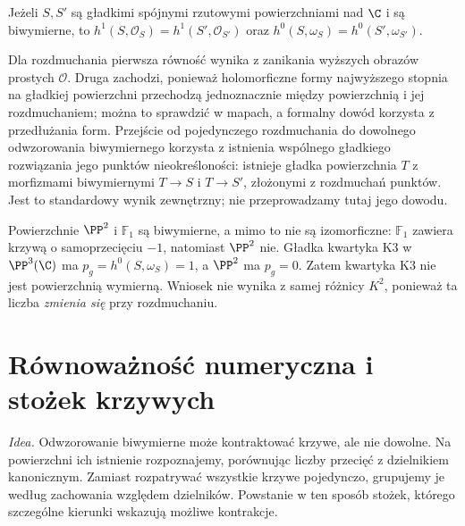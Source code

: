 \begin{twierdzenie}
\label{tw:ga8-q-pg}
Jeżeli $S,S'$ są gładkimi spójnymi rzutowymi
powierzchniami nad $\C$ i są biwymierne, to
$h^1(S,\mathcal O_S)=h^1(S',\mathcal O_{S'})$ oraz
$h^0(S,\omega_S)=h^0(S',\omega_{S'})$.
\end{twierdzenie}
\begin{uwaga}
Dla rozdmuchania pierwsza równość wynika z zanikania
wyższych obrazów prostych $\mathcal O$.
Druga zachodzi, ponieważ holomorficzne formy
najwyższego stopnia na gładkiej powierzchni
przechodzą jednoznacznie między powierzchnią i jej
rozdmuchaniem; można to sprawdzić w mapach, a
formalny dowód korzysta z przedłużania form.
Przejście od pojedynczego rozdmuchania do dowolnego
odwzorowania biwymiernego korzysta z istnienia wspólnego
gładkiego rozwiązania jego punktów nieokreśloności:
istnieje gładka powierzchnia $T$ z morfizmami
biwymiernymi $T\to S$ i $T\to S'$, złożonymi
z rozdmuchań punktów. Jest to standardowy wynik
zewnętrzny; nie przeprowadzamy tutaj jego dowodu.
\end{uwaga}

\begin{przyklad}
Powierzchnie $\PP^2$ i $\mathbb F_1$ są biwymierne,
a mimo to nie są izomorficzne: $\mathbb F_1$ zawiera
krzywą o samoprzecięciu $-1$, natomiast $\PP^2$ nie.
Gładka kwartyka K3 w $\PP^3(\C)$ ma
$p_g=h^0(S,\omega_S)=1$, a $\PP^2$ ma $p_g=0$.
Zatem kwartyka K3 nie jest powierzchnią wymierną.
Wniosek nie wynika z samej różnicy $K^2$, ponieważ
ta liczba \emph{zmienia się} przy rozdmuchaniu.
\end{przyklad}

\section{Równoważność numeryczna i stożek krzywych}
\label{sec:ga8-ne-cone}

\emph{Idea.} Odwzorowanie biwymierne może kontraktować krzywe,
ale nie dowolne. Na powierzchni ich istnienie rozpoznajemy,
porównując liczby przecięć z dzielnikiem kanonicznym.
Zamiast rozpatrywać wszystkie krzywe pojedynczo, grupujemy je
według zachowania względem dzielników. Powstanie w ten sposób
stożek, którego szczególne kierunki wskazują możliwe kontrakcje.

